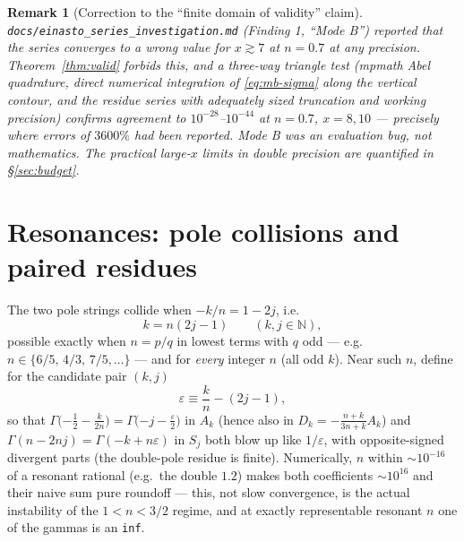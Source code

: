 \documentclass{article}
\newtheorem{remark}{Remark}
\begin{document}
\begin{remark}[Correction to the ``finite domain of validity'' claim]
\texttt{docs/einasto\_series\_investigation.md} (Finding 1, ``Mode B'')
reported that the series converges to a wrong value for $x\gtrsim7$ at
$n=0.7$ at any precision. Theorem~\ref{thm:valid} forbids this, and a
three-way triangle test (mpmath Abel quadrature, direct numerical
integration of \eqref{eq:mb-sigma} along the vertical contour, and the
residue series with adequately sized truncation and working precision)
confirms agreement to $10^{-28}$--$10^{-44}$ at $n=0.7$, $x=8,10$ ---
precisely where errors of $3600\%$ had been reported. Mode B was an
evaluation bug, not mathematics. The practical large-$x$ limits in double
precision are quantified in \S\ref{sec:budget}.
\end{remark}

\section{Resonances: pole collisions and paired residues}\label{sec:pairs}

The two pole strings collide when $-k/n = 1-2j$, i.e.
\begin{equation}\label{eq:res-cond}
k = n(2j-1)\qquad(k,j\in\mathbb{N}),
\end{equation}
possible exactly when $n=p/q$ in lowest terms with $q$ odd --- e.g.\
$n\in\{6/5,\,4/3,\,7/5,\dots\}$ --- and for \emph{every} integer $n$ (all
odd $k$). Near such $n$, define for the candidate pair $(k,j)$
\begin{equation}
\varepsilon \equiv \frac kn - (2j-1),
\end{equation}
so that $\Gamma\big({-\tfrac12}-\tfrac{k}{2n}\big) =
\Gamma\big({-j}-\tfrac\varepsilon2\big)$ in $A_k$ (hence also in
$D_k = -\tfrac{n+k}{3n+k}A_k$) and $\Gamma(n-2nj) =
\Gamma(-k+n\varepsilon)$ in $S_j$ both blow up like $1/\varepsilon$, with
opposite-signed divergent parts (the double-pole residue is finite). Numerically, $n$ within $\sim\!10^{-16}$ of a resonant
rational (e.g.\ the double $1.2$) makes both coefficients $\sim10^{16}$ and
their naive sum pure roundoff --- this, not slow convergence, is the actual
instability of the $1<n<3/2$ regime, and at exactly representable resonant
$n$ one of the gammas is an \texttt{inf}.
\end{document}
